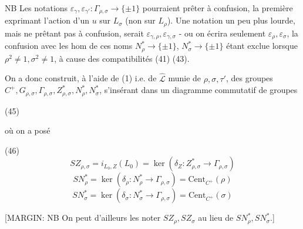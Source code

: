 \begin{enumerate}
\newpage


NB Les notations $\varepsilon_\gamma, \varepsilon_{\gamma'} : \Gamma_{\rho,\sigma} \to \{\pm 1\}$
pourraient prêter à confusion, la première
exprimant l'action d'un $u$ sur $L_\sigma$ (non sur
$L_\rho$). Une notation un peu plus lourde,
mais ne prêtant pas à confusion, serait
$\varepsilon_{\gamma,\rho}, \varepsilon_{\gamma,\sigma}$ - ou on écrira seulement $\varepsilon_\rho, \varepsilon_\sigma$,
la confusion avec les hom de ces noms
$N_\rho^* \to \{\pm 1\}$, $N_\sigma^* \to \{\pm 1\}$ étant exclue lorsque
$\rho^2 \neq 1, \sigma^2 \neq 1$, à cause des compatibilités (41) (43).

On a donc construit, à l'aide
de (1) i.e. de $\widehat{\mathcal{L}}$ munie de $\rho, \sigma, \tau'$, des
groupes $C^+, G_{\rho,\sigma}, \Gamma_{\rho,\sigma}, Z_{\rho,\sigma}^*, N_\rho^*, N_\sigma^*$, s'insérant
dans un diagramme commutatif de
groupes

(45)

où on a posé

(46)
$$ S Z_{\rho,\sigma} = i_{L_0, Z}(L_0) = \ker(\delta_Z : Z_{\rho,\sigma}^* \to \Gamma_{\rho,\sigma}) $$
$$ S N_\rho^* = \ker(\delta_\rho : N_\rho^* \to \Gamma_{\rho,\sigma}) = \text{Cent}_{C^+}(\rho) $$
$$ S N_\sigma^* = \ker(\delta_\sigma : N_\sigma^* \to \Gamma_{\rho,\sigma}) = \text{Cent}_{C^+}(\sigma) $$

[MARGIN: NB On peut d'ailleurs les noter $S Z_\rho, S Z_\sigma$ au lieu de $S N_\rho^*, S N_\sigma^*$.]

\newpage



\end{enumerate}
